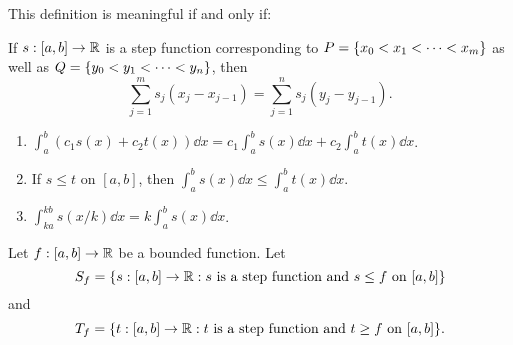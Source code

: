 \begin{rem}
    This definition is meaningful if and only if:

    If $s : [a, b] \to \mathbb{R}$ is a step function corresponding to $P = \set{x_{0} < x_{1} < \dots < x_{m}}$ as well as $Q = \set{y_{0} < y_{1} < \dots < y_{n}}$, then \[
        \sum_{j = 1}^{m} s_{j} (x_{j} - x_{j - 1}) = \sum_{j = 1}^{n} s_{j} (y_{j} - y_{j - 1}).
    \]
\end{rem}

\begin{thm}[Properties] \label{thm:int properties} \hfill
    \begin{enumerate}[label=(\alph*)]
        \item $\int_{a}^{b} (c_{1}s(x) + c_{2}t(x)) \dd x = c_{1} \int_{a}^{b} s(x) \dd x + c_{2} \int_{a}^{b} t(x) \dd x$.
        \item If $s \leq t$ on $[a, b]$, then $\int_{a}^{b} s(x) \dd x \leq \int_{a}^{b} t(x) \dd x$.
        \item $\int_{ka}^{kb} s(x/k) \dd x = k \int_{a}^{b} s(x) \dd x$.
    \end{enumerate}
\end{thm}

\begin{defn}[] \label{defn:}
    Let $f : [a, b] \to \mathbb{R}$ be a bounded function. Let \[
        S_{f} = \set{s : [a, b] \to \R : s \text{ is a step function and } s \leq f \text{ on } [a, b]}
    \] and \[
        T_{f} = \set{t : [a, b] \to \R : t \text{ is a step function and } t \geq f \text{ on } [a, b]}.
    \]
\end{defn}

